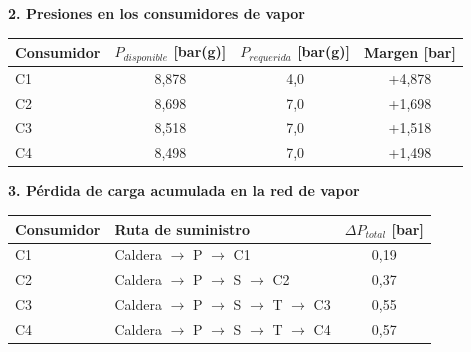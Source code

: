\documentclass[12pt]{article}
\begin{document}
\begin{landscape}
\begin{table}[H]
		\vspace{1.5cm}

		\begin{minipage}{0.48\linewidth}
			\centering
			\textbf{2. Presiones en los consumidores de vapor}
			\vspace{0.2cm}
			\begin{tabular}{lccc}
				\toprule
				\textbf{Consumidor} & \textbf{$P_{disponible}$ [bar(g)]} & \textbf{$P_{requerida}$ [bar(g)]} & \textbf{Margen [bar]} \\
				\midrule
				C1                  & 8,878                              & 4,0                               & +4,878                \\
				C2               & 8,698                              & 7,0                               & +1,698                \\
				C3               & 8,518                              & 7,0                               & +1,518                \\
				C4               & 8,498                              & 7,0                               & +1,498                \\
				\bottomrule
			\end{tabular}
		\end{minipage}
		\hfill
		\begin{minipage}{0.48\linewidth}
			\centering
			\textbf{3. Pérdida de carga acumulada en la red de vapor}
			\vspace{0.2cm}
			\begin{tabular}{llc}
				\toprule
				\textbf{Consumidor} & \textbf{Ruta de suministro}                                                 & \textbf{$\Delta P_{total}$ [bar]} \\
				\midrule
				C1                  & Caldera $\rightarrow$ P $\rightarrow$ C1                                    & 0,19                              \\
				C2               & Caldera $\rightarrow$ P $\rightarrow$ S $\rightarrow$ C2                 & 0,37                              \\
				C3               & Caldera $\rightarrow$ P $\rightarrow$ S $\rightarrow$ T $\rightarrow$ C3 & 0,55                              \\
				C4               & Caldera $\rightarrow$ P $\rightarrow$ S $\rightarrow$ T $\rightarrow$ C4 & 0,57                              \\
				\bottomrule
			\end{tabular}
		\end{minipage}
	\end{table}
\end{landscape}
\end{document}
